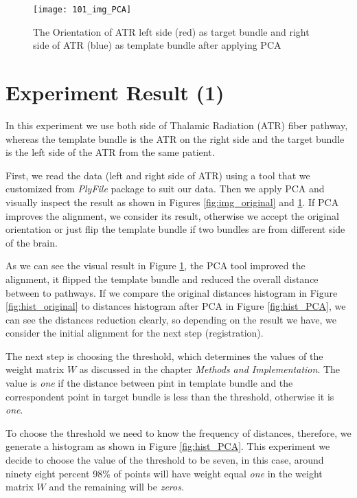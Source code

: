 \documentclass[../structure.tex]{subfiles}
\begin{document}
\begin{figure}[H]
\centering
\texttt{[image: 101\_img\_PCA]}
\captionsetup{justification=centering}
\caption{The Orientation of ATR left side (red) as target bundle and right side of ATR (blue) as template bundle after applying PCA}
\label{fig:img_PCA}
\end{figure}

\section{Experiment Result (1)}
\hspace{2em}In this experiment we use both side of Thalamic Radiation (ATR) fiber pathway, whereas the template bundle is the ATR on the right side and the target bundle is the left side of the ATR from the same patient.

First, we read the data (left and right side of ATR) using a tool that we customized from \textit{PlyFile} package to suit our data. Then we apply PCA and visually inspect the result as shown in Figures \ref{fig:img_original} and \ref{fig:img_PCA}. If PCA improves the alignment, we consider its result, otherwise we accept the original orientation or just flip the template bundle if two bundles are from different side of the brain.

As we can see the visual result in Figure \ref{fig:img_PCA}, the PCA tool improved the alignment, it flipped the template bundle and reduced the overall distance between to pathways. If we compare the original distances histogram in Figure \ref{fig:hist_original} to distances histogram after PCA in Figure \ref{fig:hist_PCA}, we can see the distances reduction clearly, so depending on the result we have, we consider the initial alignment for the next step (registration).

The next step is choosing the threshold, which determines the values of the weight matrix $W$ as discussed in the chapter \textit{Methods and Implementation}. The value  is \textit{one} if the distance between pint in template bundle and the correspondent point in target bundle is less than the threshold, otherwise it is \textit{one}. 

To choose the threshold we need to know the frequency of distances, therefore, we generate a histogram as shown in Figure \ref{fig:hist_PCA}. This experiment we decide to choose the value of the threshold to be seven, in this case, around ninety eight percent 98\% of points will have weight equal \textit{one} in the weight matrix $W$ and the remaining will be \textit{zeros}.
\end{document}
